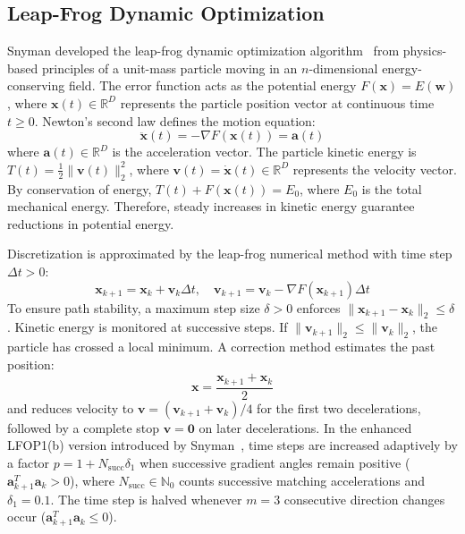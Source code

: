 \documentclass[conference,10pt]{IEEEtran}
\begin{document}
\subsection{Leap-Frog Dynamic Optimization}
Snyman developed the leap-frog dynamic optimization algorithm~\cite{snyman1982} from physics-based principles of a unit-mass particle moving in an $n$-dimensional energy-conserving field. The error function acts as the potential energy $F(\mathbf{x}) = E(\mathbf{w})$, where $\mathbf{x}(t) \in \mathbb{R}^D$ represents the particle position vector at continuous time $t \ge 0$. Newton's second law defines the motion equation:
\begin{equation}
\ddot{\mathbf{x}}(t) = -\nabla F(\mathbf{x}(t)) = \mathbf{a}(t)
\end{equation}
where $\mathbf{a}(t) \in \mathbb{R}^D$ is the acceleration vector. The particle kinetic energy is $T(t) = \frac{1}{2} \|\mathbf{v}(t)\|_2^2$, where $\mathbf{v}(t) = \dot{\mathbf{x}}(t) \in \mathbb{R}^D$ represents the velocity vector. By conservation of energy, $T(t) + F(\mathbf{x}(t)) = E_0$, where $E_0$ is the total mechanical energy. Therefore, steady increases in kinetic energy guarantee reductions in potential energy.

Discretization is approximated by the leap-frog numerical method with time step $\Delta t > 0$:
\begin{equation}
\mathbf{x}_{k+1} = \mathbf{x}_k + \mathbf{v}_k \Delta t, \quad \mathbf{v}_{k+1} = \mathbf{v}_k - \nabla F(\mathbf{x}_{k+1}) \Delta t
\end{equation}
To ensure path stability, a maximum step size $\delta > 0$ enforces $\|\mathbf{x}_{k+1} - \mathbf{x}_k\|_2 \le \delta$. Kinetic energy is monitored at successive steps. If $\|\mathbf{v}_{k+1}\|_2 \le \|\mathbf{v}_k\|_2$, the particle has crossed a local minimum. A correction method estimates the past position:
\begin{equation}
\mathbf{x} = \frac{\mathbf{x}_{k+1} + \mathbf{x}_k}{2}
\end{equation}
and reduces velocity to $\mathbf{v} = (\mathbf{v}_{k+1} + \mathbf{v}_k)/4$ for the first two decelerations, followed by a complete stop $\mathbf{v} = \mathbf{0}$ on later decelerations. In the enhanced LFOP1(b) version introduced by Snyman~\cite{snyman1983}, time steps are increased adaptively by a factor $p = 1 + N_{\text{succ}} \delta_1$ when successive gradient angles remain positive ($\mathbf{a}_{k+1}^T \mathbf{a}_k > 0$), where $N_{\text{succ}} \in \mathbb{N}_0$ counts successive matching accelerations and $\delta_1 = 0.1$. The time step is halved whenever $m = 3$ consecutive direction changes occur ($\mathbf{a}_{k+1}^T \mathbf{a}_k \le 0$).
\end{document}
